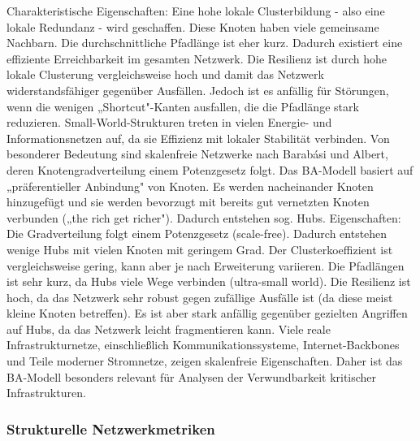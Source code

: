 Charakteristische Eigenschaften:
	Eine hohe lokale Clusterbildung - also eine lokale Redundanz - wird geschaffen. Diese Knoten haben viele gemeinsame Nachbarn.
	Die durchschnittliche Pfadlänge ist eher kurz. Dadurch existiert eine effiziente Erreichbarkeit im gesamten Netzwerk.
	Die Resilienz ist durch hohe lokale Clusterung vergleichsweise hoch und damit das Netzwerk widerstandsfähiger gegenüber Ausfällen. Jedoch ist es anfällig für Störungen, wenn die wenigen „Shortcut"-Kanten ausfallen, die die Pfadlänge stark reduzieren.
Small-World-Strukturen treten in vielen Energie- und Informationsnetzen auf, da sie Effizienz mit lokaler Stabilität verbinden.
Von besonderer Bedeutung sind skalenfreie Netzwerke nach Barabási und Albert, deren Knotengradverteilung einem Potenzgesetz folgt. Das BA-Modell \citep{Albert2000ErrorAttack} basiert auf „präferentieller Anbindung" von Knoten. Es werden nacheinander Knoten hinzugefügt und sie werden bevorzugt mit bereits gut vernetzten Knoten verbunden („the rich get richer"). Dadurch entstehen sog. Hubs.
Eigenschaften:
	Die Gradverteilung folgt einem Potenzgesetz (scale-free). Dadurch entstehen wenige Hubs mit vielen Knoten mit geringem Grad.
	Der Clusterkoeffizient ist vergleichsweise gering, kann aber je nach Erweiterung variieren.
	Die Pfadlängen ist sehr kurz, da Hubs viele Wege verbinden (ultra-small world).
	Die Resilienz ist hoch, da das Netzwerk sehr robust gegen zufällige Ausfälle ist (da diese meist kleine Knoten betreffen). Es ist aber stark anfällig gegenüber gezielten Angriffen auf Hubs, da das Netzwerk leicht fragmentieren kann.
Viele reale Infrastrukturnetze, einschließlich Kommunikationssysteme, Internet-Backbones und Teile moderner Stromnetze, zeigen skalenfreie Eigenschaften. Daher ist das BA-Modell besonders relevant für Analysen der Verwundbarkeit kritischer Infrastrukturen.

\subsubsection{Strukturelle Netzwerkmetriken}

